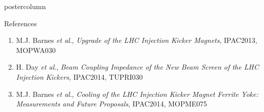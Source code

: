\documentclass[final,hyperref={pdfpagelabels=false}]{beamer}
\begin{document}
\begin{frame}
\begin{columns}
\begin{column}{.49\textwidth}
\begin{beamercolorbox}[center,wd=\textwidth]{postercolumn}
\begin{minipage}[T]{.95\textwidth}
{\vfill
\begin{block}{References}
\begin{enumerate}
\item{\small{M.J. Barnes \emph{et al}., \emph{Upgrade of the LHC Injection Kicker Magnets}, IPAC2013, MOPWA030}}
\item{\small{H. Day \emph{et al}., \emph{Beam Coupling Impedance of the New Beam Screen of the LHC Injection Kickers}, IPAC2014, TUPRI030}}
\item{\small{M.J. Barnes \emph{et al}., \emph{Cooling of the LHC Injection Kicker Magnet Ferrite Yoke: Measurements and Future Proposals}, IPAC2014, MOPME075}}
\end{enumerate}
\end{block}


\vfill

          }
        \end{minipage}
      \end{beamercolorbox}
    \end{column}
  \end{columns}

\end{frame}
\end{document}
